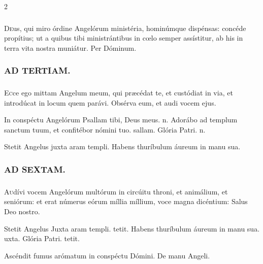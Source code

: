 \documentclass[9pt,twoside]{extarticle}
\begin{document}
\begin{multicols}{2}
\subsubsection*{\center {}}
\lettrine{D}eus, qui miro órdine Angelórum ministéria, hominúmque dispénsas: concéde propítius; ut a quibus tibi ministrántibus in cœlo semper assístitur, ab his in terra vita nostra muniátur. Per Dóminum.

\begin{tightlist}{}
\item {}
\end{tightlist}

\subsubsection*{\center \textsc{AD TERTIAM.}}
\subsubsection*{}
\lettrine{E}cce ego mittam Angelum meum, qui præcédat te, et custódiat in via, et introdúcat in locum quem parávi. Obsérva eum, et audi vocem ejus.

\begin{tightlist}{}
\item {} In conspéctu Angelórum \textred{*} Psallam tibi, Deus meus. n.  Adorábo ad templum sanctum tuum, et confitébor nómini tuo. sallam. Glória Patri. n.
\item {} Stetit Angelus juxta aram templi.  Habens thuríbulum áureum in manu sua.
\end{tightlist}

\subsubsection*{\center \textsc{AD SEXTAM.}}
\subsubsection*{}
\lettrine{A}udívi vocem Angelórum multórum in circúitu throni, et animálium, et seniórum: et erat númerus eórum míllia míllium, voce magna dicéntium: Salus Deo nostro.

\begin{tightlist}{}
\item {} Stetit Angelus \textred{*} Juxta aram templi. tetit.  Habens thuríbulum áureum in manu sua. uxta. Glória Patri. tetit.
\item {} Ascéndit fumus arómatum in conspéctu Dómini.  De manu Angeli.
\end{tightlist}


\end{multicols}
\end{document}
